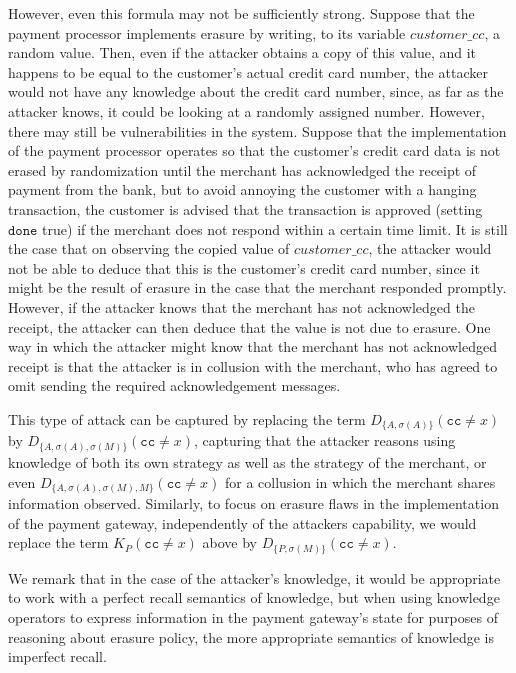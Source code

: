 \documentclass[a4wide]{article}
\theoremstyle{examplesty}
\newcommand{\strat}{\sigma}
\newcommand{\cc}{\mathtt{cc}}
\newcommand{\done}{\mathtt{done}}
\begin{document}
However, even this formula may not be sufficiently strong. Suppose that the payment processor
implements erasure by 
writing,   to its variable $\mathit{customer\_cc}$, a random value. 
Then, even if the attacker obtains a copy of this value, and it happens to be equal to the customer's
actual credit card number, the attacker would not have any knowledge about the credit card number, 
since, as far as the attacker knows, it could be looking at a randomly assigned number. 
However, there may still be vulnerabilities in the system. Suppose that the implementation of 
the payment processor operates so that the customer's credit card data is not erased by randomization until 
the merchant has acknowledged the receipt of payment from the bank, but to 
avoid annoying the customer with a hanging transaction, the customer is advised that the
transaction is approved (setting $\done$ true) if the merchant does not respond within a certain 
time limit. It is still the case that on  observing the copied value of $\mathit{customer\_cc} $, 
the attacker would not be able to deduce that this is the customer's credit card number, since it might be 
the result of erasure in the case that the merchant responded promptly. However, if the attacker knows that the merchant has not
acknowledged the receipt, the attacker can then deduce that the value  is not due to erasure. 
One way in which the attacker might know that the merchant has not acknowledged receipt
is that the attacker is in collusion with the merchant, who has agreed to omit sending 
the required acknowledgement messages. 

This type of attack can be captured by
replacing the term $D_{\{ A, \strat(A)\}} (  \cc \neq x)$
by $D_{\{ A, \strat(A), \strat(M)\}} (  \cc \neq x)$, 
capturing  that the attacker reasons using knowledge of both its own 
strategy as well as the strategy of the merchant, 
or even $D_{\{ A, \strat(A), \strat(M), M\}} (  \cc \neq x)$ for a collusion in which the
merchant shares information observed. Similarly, to focus on erasure flaws in the 
implementation of the payment gateway, independently of the attackers capability, 
we would replace the term $K_P( \cc \neq x)$ above by 
$D_{\{P, \sigma(M)\}}(\cc \neq x)$. 

We remark that in the case of the attacker's knowledge, 
it would be appropriate to work with a perfect recall semantics of 
knowledge, but when using knowledge operators to express information 
in the payment gateway's state for purposes of reasoning about erasure 
policy, the more appropriate semantics of knowledge is imperfect recall. 
\end{document}
